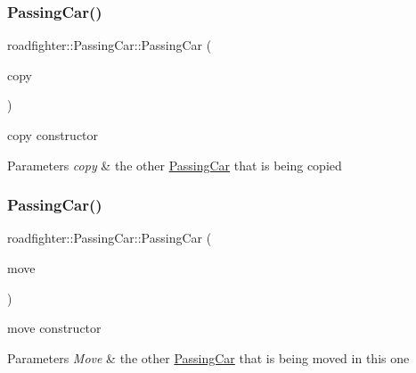 \subsubsection{\texorpdfstring{Passing\+Car()}{PassingCar()}\hspace{0.1cm}{\footnotesize\ttfamily [3/4]}}
{\footnotesize\ttfamily roadfighter\+::\+Passing\+Car\+::\+Passing\+Car (\begin{DoxyParamCaption}\item[{const \hyperlink{classroadfighter_1_1PassingCar}{Passing\+Car} \&}]{copy }\end{DoxyParamCaption})\hspace{0.3cm}{\ttfamily [default]}}

copy constructor 
\begin{DoxyParams}{Parameters}
{\em copy} & the other \hyperlink{classroadfighter_1_1PassingCar}{Passing\+Car} that is being copied \\
\hline
\end{DoxyParams}
\mbox{\label{classroadfighter_1_1PassingCar_aabea2fb415c816c0308399cd49732d83}} 
\subsubsection{\texorpdfstring{Passing\+Car()}{PassingCar()}\hspace{0.1cm}{\footnotesize\ttfamily [4/4]}}
{\footnotesize\ttfamily roadfighter\+::\+Passing\+Car\+::\+Passing\+Car (\begin{DoxyParamCaption}\item[{\hyperlink{classroadfighter_1_1PassingCar}{Passing\+Car} \&\&}]{move }\end{DoxyParamCaption})\hspace{0.3cm}{\ttfamily [default]}}

move constructor 
\begin{DoxyParams}{Parameters}
{\em Move} & the other \hyperlink{classroadfighter_1_1PassingCar}{Passing\+Car} that is being moved in this one \\
\hline
\end{DoxyParams}
\mbox{\label{classroadfighter_1_1PassingCar_ab590a845658cdb5aae74c0a922548aa8}} 
